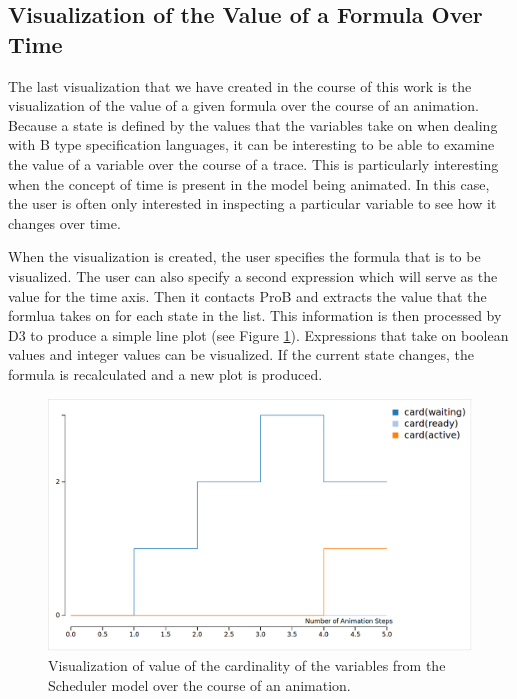 \subsection{Visualization of the Value of a Formula Over Time}

The last visualization that we have created in the course of this work is the visualization of the value of a given formula over the course of an animation.
Because a state is defined by the values that the variables take on when dealing with B type specification languages, it can be interesting to be able to examine the value of a variable over the course of a trace. This is particularly interesting when the concept of time is present in the model being animated. In this case, the user is often only interested in inspecting a particular variable to see how it changes over time. 

When the visualization is created, the user specifies the formula that is to be visualized. The user can also specify a second expression which will serve as the value for the time axis. Then it contacts ProB and extracts the value that the formlua takes on for each state in the list. This information is then processed by D3 to produce a simple line plot (see Figure \ref{timeVsValue}). Expressions that take on boolean values and integer values can be visualized. If the current state changes, the formula is recalculated and a new plot is produced.

\begin{center}
\begin{figure}[h!]
\centering
\includegraphics[width=14cm]{bilder/valueOverTime.png}
\caption{Visualization of value of the cardinality of the variables from the Scheduler model over the course of an animation.}
\label{timeVsValue}
\end{figure}
\end{center}

